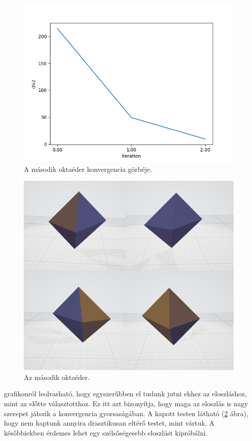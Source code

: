 \begin{figure}[h!]
	\centering
	\includegraphics[scale=0.7]{images/octahedron_02.png}
	\caption{A második oktaéder konvergencia görbéje.}
	\label{fig:octa02}
\end{figure}

\begin{figure}[h!]
	\centering
	\includegraphics[width=\textwidth]{images/octa02obj.png}
	\caption{Az második oktaéder.}
	\label{fig:octa02obj}
\end{figure}

 grafikonról leolvasható, hogy egyszerűbben el tudunk jutni ehhez az eloszláshoz, mint az előtte választotthoz.
Ez itt azt bizonyítja, hogy maga az eloszlás is nagy szerepet játszik a konvergencia gyorsaságában.
A kapott testen látható (\ref{fig:octa02obj} ábra), hogy nem kaptunk annyira drasztikusan eltérő testet, mint vártuk.
A későbbiekben érdemes lehet egy szélsőségesebb eloszlást kipróbálni.